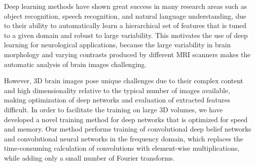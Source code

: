 

% 

Deep learning methods have shown great success in many research areas such as
object recognition, speech recognition, and natural language understanding, due
to their ability to automatically learn a hierarchical set of features that is
tuned to a given domain and robust to large variability. This motivates the use
of deep learning for neurological applications, because the large variability in
brain morphology and varying contrasts produced by different MRI scanners makes
the automatic analysis of brain images challenging.

However, 3D brain images pose unique challenges due to their complex content
and high dimensionality relative to the typical number of images available,
making optimization of deep networks and evaluation of extracted features
difficult. In order to facilitate the training on large 3D volumes, we have
developed a novel training method for deep networks that is optimized
for speed and memory. Our method performs training of convolutional deep belief
networks and convolutional neural networks in the frequency domain, which
replaces the time-consuming calculation of convolutions with element-wise
multiplications, while adding only a small number of Fourier transforms.


